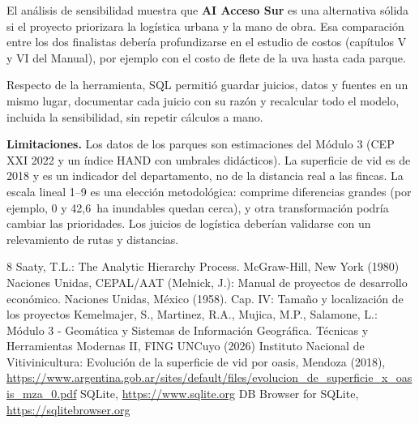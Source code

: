 \documentclass[runningheads]{llncs}
\begin{document}
El análisis de sensibilidad muestra que \textbf{AI Acceso Sur} es una alternativa sólida si el proyecto priorizara la logística urbana y la mano de obra. Esa comparación entre los dos finalistas debería profundizarse en el estudio de costos (capítulos V y VI del Manual), por ejemplo con el costo de flete de la uva hasta cada parque.

Respecto de la herramienta, SQL permitió guardar juicios, datos y fuentes en un mismo lugar, documentar cada juicio con su razón y recalcular todo el modelo, incluida la sensibilidad, sin repetir cálculos a mano.

\textbf{Limitaciones.} Los datos de los parques son estimaciones del Módulo 3 (CEP XXI 2022 y un índice HAND con umbrales didácticos). La superficie de vid es de 2018 y es un indicador del departamento, no de la distancia real a las fincas. La escala lineal 1--9 es una elección metodológica: comprime diferencias grandes (por ejemplo, 0 y 42,6~ha inundables quedan cerca), y otra transformación podría cambiar las prioridades. Los juicios de logística deberían validarse con un relevamiento de rutas y distancias.

\begin{thebibliography}{8}
 Saaty, T.L.: The Analytic Hierarchy Process. McGraw-Hill, New York (1980)
 Naciones Unidas, CEPAL/AAT (Melnick, J.): Manual de proyectos de desarrollo económico. Naciones Unidas, México (1958). Cap. IV: Tamaño y localización de los proyectos
 Kemelmajer, S., Martinez, R.A., Mujica, M.P., Salamone, L.: Módulo 3 - Geomática y Sistemas de Información Geográfica. Técnicas y Herramientas Modernas II, FING UNCuyo (2026)
 Instituto Nacional de Vitivinicultura: Evolución de la superficie de vid por oasis, Mendoza (2018), \url{https://www.argentina.gob.ar/sites/default/files/evolucion_de_superficie_x_oasis_mza_0.pdf}
 SQLite, \url{https://www.sqlite.org}
 DB Browser for SQLite, \url{https://sqlitebrowser.org}
\end{thebibliography}
\end{document}
